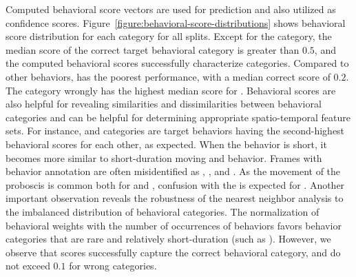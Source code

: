 Computed behavioral score vectors are used for prediction and also utilized as confidence scores.
Figure~\ref{figure:behavioral-score-distributions} shows behavioral score distribution for each category for all splits.
Except for the \Feeding category, the median score of the correct target behavioral category is greater than $0.5$, and the computed behavioral scores successfully characterize categories.
Compared to other behaviors, \Feeding has the poorest performance, with a median correct score of $0.2$.
The \PosturalAdjustment category wrongly has the highest median score for \Feeding.
Behavioral scores are also helpful for revealing similarities and dissimilarities between behavioral categories and can be helpful for determining appropriate spatio-temporal feature sets.
For instance, \Grooming and \PosturalAdjustment categories are target behaviors having the second-highest behavioral scores for each other, as expected.
When the \Grooming behavior is short, it becomes more similar to short-duration moving and \PosturalAdjustment behavior.
Frames with \Feeding behavior annotation are often misidentified as \PosturalAdjustment, \Grooming, and \ProboscisPumping.
As the movement of the proboscis is common both for \Feeding and \ProboscisPumping, confusion with the \ProboscisPumping is expected for \Feeding.
Another important observation reveals the robustness of the nearest neighbor analysis to the imbalanced distribution of behavioral categories.
The normalization of behavioral weights with the number of occurrences of behaviors favors behavior categories that are rare and relatively short-duration (such as \HaltereSwitch). However, we observe that \HaltereSwitch scores successfully capture the correct behavioral category, and do not exceed $0.1$ for wrong categories.

